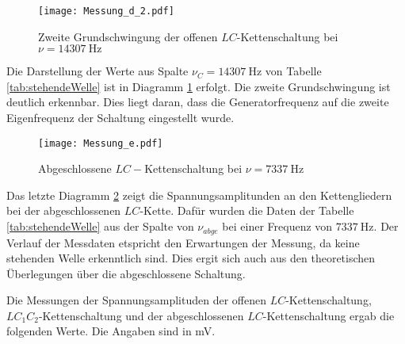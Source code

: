 \FloatBarrier
\begin{figure}
  \texttt{[image: Messung\_d\_2.pdf]}
  \caption{Zweite Grundschwingung der offenen $LC$-Kettenschaltung bei $\nu = \SI{14307}{\hertz}$}
  \label{fig:Messungd2}
\end{figure}

Die Darstellung der Werte aus Spalte $\nu_{C} = \SI{14307}{\hertz}$ von Tabelle \ref{tab:stehendeWelle}
ist in Diagramm \ref{fig:Messungd2} erfolgt. Die zweite Grundschwingung ist deutlich
erkennbar. Dies liegt daran, dass die Generatorfrequenz auf die zweite
Eigenfrequenz der Schaltung eingestellt wurde.

\FloatBarrier
\begin{figure}
  \texttt{[image: Messung\_e.pdf]}
  \caption{Abgeschlossene $LC-$Kettenschaltung bei $\nu = \SI{7337}{\hertz}$}
  \label{fig:Messunge}
\end{figure}

Das letzte Diagramm \ref{fig:Messunge} zeigt die Spannungsamplitunden
an den Kettengliedern bei der abgeschlossenen $LC$-Kette. Dafür wurden die
Daten der Tabelle \ref{tab:stehendeWelle} aus der Spalte von $\nu_{abge}$
bei einer Frequenz von $\SI{7337}{\hertz}$. Der Verlauf der Messdaten etspricht
den Erwartungen der Messung, da keine stehenden Welle erkenntlich sind.
Dies ergit sich auch aus den theoretischen Überlegungen über die
abgeschlossene Schaltung.

Die Messungen der Spannungsamplituden der offenen $LC$-Kettenschaltung, $LC_1C_2$-Kettenschaltung
und der abgeschlossenen $LC$-Kettenschaltung ergab die folgenden Werte. Die Angaben sind
in \si{\milli\volt}.

